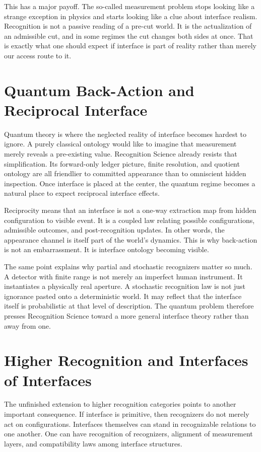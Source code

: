 \documentclass[11pt]{article}
\begin{document}
This has a major payoff.
The so-called measurement problem stops looking like a strange exception in physics and starts looking like a clue about interface realism.
Recognition is not a passive reading of a pre-cut world.
It is the actualization of an admissible cut, and in some regimes the cut changes both sides at once.
That is exactly what one should expect if interface is part of reality rather than merely our access route to it.

\section{Quantum Back-Action and Reciprocal Interface}

Quantum theory is where the neglected reality of interface becomes hardest to ignore.
A purely classical ontology would like to imagine that measurement merely reveals a pre-existing value.
Recognition Science already resists that simplification.
Its forward-only ledger picture, finite resolution, and quotient ontology are all friendlier to committed appearance than to omniscient hidden inspection.
Once interface is placed at the center, the quantum regime becomes a natural place to expect reciprocal interface effects.

Reciprocity means that an interface is not a one-way extraction map from hidden configuration to visible event.
It is a coupled law relating possible configurations, admissible outcomes, and post-recognition updates.
In other words, the appearance channel is itself part of the world's dynamics.
This is why back-action is not an embarrassment.
It is interface ontology becoming visible.

The same point explains why partial and stochastic recognizers matter so much.
A detector with finite range is not merely an imperfect human instrument.
It instantiates a physically real aperture.
A stochastic recognition law is not just ignorance pasted onto a deterministic world.
It may reflect that the interface itself is probabilistic at that level of description.
The quantum problem therefore presses Recognition Science toward a more general interface theory rather than away from one.

\section{Higher Recognition and Interfaces of Interfaces}

The unfinished extension to higher recognition categories points to another important consequence.
If interface is primitive, then recognizers do not merely act on configurations.
Interfaces themselves can stand in recognizable relations to one another.
One can have recognition of recognizers, alignment of measurement layers, and compatibility laws among interface structures.
\end{document}
